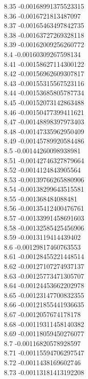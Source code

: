 {8.35	-0.00168991375523315\\
8.36	-0.0016721813487097\\
8.37	-0.00165463497842735\\
8.38	-0.00163727269328118\\
8.39	-0.00162009256260772\\
8.4	-0.00160309267598134\\
8.41	-0.00158627114300122\\
8.42	-0.00156962609307817\\
8.43	-0.00155315567523116\\
8.44	-0.00153685805787734\\
8.45	-0.00152073142863488\\
8.46	-0.00150477399411621\\
8.47	-0.00148898397973403\\
8.48	-0.00147335962950409\\
8.49	-0.00145789920584486\\
8.5	-0.00144260098938981\\
8.51	-0.00142746327879664\\
8.52	-0.0014124843905564\\
8.53	-0.00139766265880906\\
8.54	-0.00138299643515581\\
8.55	-0.001368484088481\\
8.56	-0.00135412400476761\\
8.57	-0.00133991458691603\\
8.58	-0.00132585425456906\\
8.59	-0.0013119414439402\\
8.6	-0.00129817460763553\\
8.61	-0.00128455221448514\\
8.62	-0.00127107274937137\\
8.63	-0.00125773471305707\\
8.64	-0.00124453662202978\\
8.65	-0.00123147700832355\\
8.66	-0.00121855441936635\\
8.67	-0.0012057674178178\\
8.68	-0.00119311458140382\\
8.69	-0.00118059450276077\\
8.7	-0.00116820578928597\\
8.71	-0.00115594706297547\\
8.72	-0.0011438169602746\\
8.73	-0.00113181413192208\\
}
